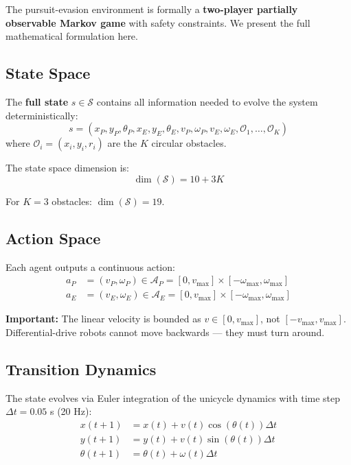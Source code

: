 \documentclass[11pt,a4paper]{report}
\begin{document}
The pursuit-evasion environment is formally a \textbf{two-player partially observable Markov game} with safety constraints. We present the full mathematical formulation here.

\subsection{State Space}

The \textbf{full state} $s \in \mathcal{S}$ contains all information needed to evolve the system deterministically:
\begin{equation}
    s = (x_P, y_P, \theta_P, x_E, y_E, \theta_E, v_P, \omega_P, v_E, \omega_E, \mathcal{O}_1, \ldots, \mathcal{O}_K)
\end{equation}
where $\mathcal{O}_i = (x_i, y_i, r_i)$ are the $K$ circular obstacles.

The state space dimension is:
\begin{equation}
    \dim(\mathcal{S}) = 10 + 3K
\end{equation}

For $K=3$ obstacles: $\dim(\mathcal{S}) = 19$.

\subsection{Action Space}

Each agent outputs a continuous action:
\begin{align}
    a_P &= (v_P, \omega_P) \in \mathcal{A}_P = [0, v_{\max}] \times [-\omega_{\max}, \omega_{\max}] \\
    a_E &= (v_E, \omega_E) \in \mathcal{A}_E = [0, v_{\max}] \times [-\omega_{\max}, \omega_{\max}]
\end{align}

\begin{warningbox}
\textbf{Important:} The linear velocity is bounded as $v \in [0, v_{\max}]$, not $[-v_{\max}, v_{\max}]$. Differential-drive robots cannot move backwards --- they must turn around.
\end{warningbox}

\subsection{Transition Dynamics}

The state evolves via Euler integration of the unicycle dynamics with time step $\Delta t = 0.05$ s (20 Hz):
\begin{align}
    x(t+1) &= x(t) + v(t) \cos(\theta(t)) \Delta t \\
    y(t+1) &= y(t) + v(t) \sin(\theta(t)) \Delta t \\
    \theta(t+1) &= \theta(t) + \omega(t) \Delta t
\end{align}
\end{document}
